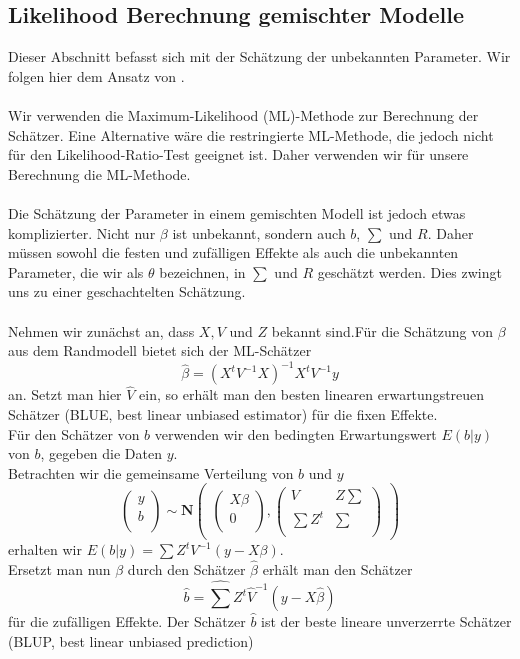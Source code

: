 \documentclass[%
thesis=student,%
coverpage=false,%
titlepage=false,%
headmarks=true, %
german,%
font=libertine, %
math=newpxtx, %
BCOR=5mm,%
coverBCOR=11mm%
]{tumbook}
\theoremstyle{break}
\begin{document}
\subsection{Likelihood Berechnung gemischter Modelle}
Dieser Abschnitt befasst sich mit der Schätzung der unbekannten Parameter. Wir folgen hier dem Ansatz von \cite{fahrmeir2010} .\\
\\
Wir verwenden die Maximum-Likelihood (ML)-Methode zur Berechnung der Schätzer. Eine Alternative wäre die restringierte ML-Methode, die jedoch nicht für den Likelihood-Ratio-Test geeignet ist. Daher verwenden wir für unsere Berechnung die ML-Methode.\\
\\
Die Schätzung der Parameter in einem gemischten Modell ist jedoch etwas komplizierter. Nicht nur $\beta$ ist unbekannt, sondern auch $b$, $\sum$ und $R$. Daher müssen sowohl die festen und zufälligen Effekte als auch die unbekannten Parameter, die wir als $\theta$ bezeichnen, in $\sum$ und $R$ geschätzt werden. Dies zwingt uns zu einer geschachtelten Schätzung.\\
\\
Nehmen wir zunächst an, dass $X,V$ und $Z$ bekannt sind.Für die Schätzung von $\beta$ aus dem Randmodell bietet sich der ML-Schätzer $$\hat{\beta} = (X^t V^{-1}X)^{-1}X^t V^{-1}y$$ an. Setzt man hier $\hat{V}$ ein, so erhält man den besten linearen erwartungstreuen Schätzer (BLUE, best linear unbiased estimator) für die fixen Effekte. \\
Für den Schätzer von $b$ verwenden wir den bedingten Erwartungswert $E(b|y)$ von $b$, gegeben die Daten $y$. \\
Betrachten wir die gemeinsame Verteilung von $b$ und $y$ 
$$\begin{pmatrix}
	y \\
	b \\
\end{pmatrix}
\sim
\mathbf{N}
\begin{pmatrix}
	\begin{pmatrix}
		
		X\beta \\
		0 \\
	\end{pmatrix},
	\begin{pmatrix}
		V & Z\sum \\
		\sum Z^t & \sum \\
	\end{pmatrix}
\end{pmatrix}$$
erhalten wir $E(b|y) = \sum Z^tV^{-1}(y-X\beta)$. \\
Ersetzt man nun $\beta$ durch den Schätzer $\hat{\beta}$ erhält man den Schätzer $$\hat{b} = \hat{\sum} Z^t\hat{V}^{-1}(y-X\hat{\beta})$$ für die zufälligen Effekte. Der Schätzer $\hat{b}$ ist der beste lineare unverzerrte Schätzer (BLUP, best linear unbiased prediction)\\
\end{document}
